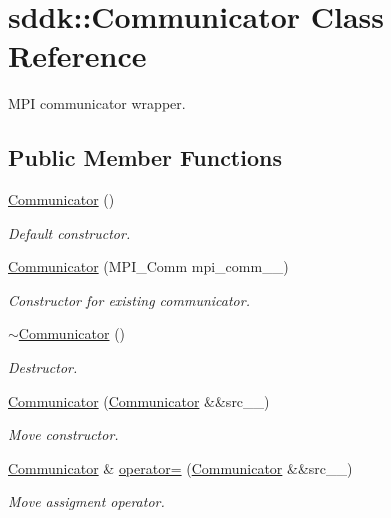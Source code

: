 \hypertarget{classsddk_1_1_communicator}{}\section{sddk\+:\+:Communicator Class Reference}
\label{classsddk_1_1_communicator}


M\+P\+I communicator wrapper.  


\subsection*{Public Member Functions}
\begin{DoxyCompactItemize}
\item 
\hyperlink{classsddk_1_1_communicator_a1a6949d5b0ab726398e2e72f01a4eeed}{Communicator} ()
\begin{DoxyCompactList}\small\item\em Default constructor. \end{DoxyCompactList}\item 
\hyperlink{classsddk_1_1_communicator_a74d08c2e24699de2e253407e73e7c1f9}{Communicator} (M\+P\+I\+\_\+\+Comm mpi\+\_\+comm\+\_\+\+\_\+)
\begin{DoxyCompactList}\small\item\em Constructor for existing communicator. \end{DoxyCompactList}\item 
\hyperlink{classsddk_1_1_communicator_a0db11d624a1e15a3311fc135cbf2a5b4}{$\sim$\+Communicator} ()
\begin{DoxyCompactList}\small\item\em Destructor. \end{DoxyCompactList}\item 
\hyperlink{classsddk_1_1_communicator_abb956271307484b94b358a56c44dcd51}{Communicator} (\hyperlink{classsddk_1_1_communicator}{Communicator} \&\&src\+\_\+\+\_\+)
\begin{DoxyCompactList}\small\item\em Move constructor. \end{DoxyCompactList}\item 
\hyperlink{classsddk_1_1_communicator}{Communicator} \& \hyperlink{classsddk_1_1_communicator_a4befc1018975809550ad68e8374a1df6}{operator=} (\hyperlink{classsddk_1_1_communicator}{Communicator} \&\&src\+\_\+\+\_\+)
\begin{DoxyCompactList}\small\item\em Move assigment operator. \end{DoxyCompactList}\item 

\end{DoxyCompactItemize}
